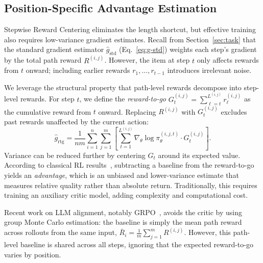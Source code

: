 \subsection{Position-Specific Advantage Estimation}
\label{sec:advantage}

Stepwise Reward Centering eliminates the length shortcut, but effective training also requires low-variance gradient estimates. Recall from Section~\ref{sec:task} that the standard gradient estimator $\hat{g}_{\mathrm{std}}$ (Eq.~\eqref{eq:g-std}) weights each step's gradient by the total path reward $R^{(i,j)}$. However, the item at step $t$ only affects rewards from $t$ onward; including earlier rewards $r_1, \ldots, r_{t-1}$ introduces irrelevant noise.

We leverage the structural property that path-level rewards decompose into step-level rewards. For step $t$, we define the \emph{reward-to-go} $G_t^{(i,j)} = \sum_{\ell=t}^{L^{(i, j)}} r_\ell^{(i,j)}$ as the cumulative reward from $t$ onward. Replacing $R^{(i,j)}$ with $G_t^{(i,j)}$ excludes past rewards unaffected by the current action:
\begin{equation}
\hat{g}_{\mathrm{rtg}} = \frac{1}{nm}\sum_{i=1}^{n}\sum_{j=1}^{m}\left[\sum_{t=1}^{L^{(i,j)}} \nabla_\theta \log \pi_\theta^{(i,j,t)} \cdot G_t^{(i,j)}\right].
\label{eq:g-rtg}
\end{equation}
Variance can be reduced further by centering $G_t$ around its expected value. According to classical RL results~\cite{Williams92simple}, subtracting a baseline from the reward-to-go yields an \emph{advantage}, which is an unbiased and lower-variance estimate that measures relative quality rather than absolute return. Traditionally, this requires training an auxiliary critic model, adding complexity and computational cost.

Recent work on LLM alignment, notably GRPO~\cite{shao2024deepseekmath}, avoids the critic by using group Monte Carlo estimation: the baseline is simply the mean path reward across rollouts from the same input, $\bar{R}_i = \frac{1}{m}\sum_{j=1}^m R^{(i,j)}$. However, this path-level baseline is shared across all steps, ignoring that the expected reward-to-go varies by position.

